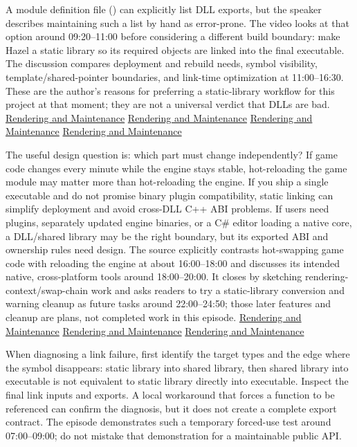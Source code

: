 A module definition file () can explicitly list DLL exports, but the speaker describes maintaining such a list by hand as error-prone. The video looks at that option around 09:20--11:00 before considering a different build boundary: make Hazel a static library so its required objects are linked into the final executable. The discussion compares deployment and rebuild needs, symbol visibility, template/shared-pointer boundaries, and link-time optimization at 11:00--16:30. These are the author's reasons for preferring a static-library workflow for this project at that moment; they are not a universal verdict that DLLs are bad. \href{https://www.youtube.com/watch?v=695SyEyFwWU&t=550s}{Rendering and Maintenance} \href{https://www.youtube.com/watch?v=695SyEyFwWU&t=660s}{Rendering and Maintenance} \href{https://www.youtube.com/watch?v=695SyEyFwWU&t=780s}{Rendering and Maintenance} \href{https://www.youtube.com/watch?v=695SyEyFwWU&t=930s}{Rendering and Maintenance}

The useful design question is: which part must change independently? If game code changes every minute while the engine stays stable, hot-reloading the game module may matter more than hot-reloading the engine. If you ship a single executable and do not promise binary plugin compatibility, static linking can simplify deployment and avoid cross-DLL C++ ABI problems. If users need plugins, separately updated engine binaries, or a C\# editor loading a native core, a DLL/shared library may be the right boundary, but its exported ABI and ownership rules need design. The source explicitly contrasts hot-swapping game code with reloading the engine at about 16:00--18:00 and discusses its intended native, cross-platform tools around 18:00--20:00. It closes by sketching rendering-context/swap-chain work and asks readers to try a static-library conversion and warning cleanup as future tasks around 22:00--24:50; those later features and cleanup are plans, not completed work in this episode. \href{https://www.youtube.com/watch?v=695SyEyFwWU&t=960s}{Rendering and Maintenance} \href{https://www.youtube.com/watch?v=695SyEyFwWU&t=1080s}{Rendering and Maintenance} \href{https://www.youtube.com/watch?v=695SyEyFwWU&t=1320s}{Rendering and Maintenance}

When diagnosing a link failure, first identify the target types and the edge where the symbol disappears: static library into shared library, then shared library into executable is not equivalent to static library directly into executable. Inspect the final link inputs and exports. A local workaround that forces a function to be referenced can confirm the diagnosis, but it does not create a complete export contract. The episode demonstrates such a temporary forced-use test around 07:00--09:00; do not mistake that demonstration for a maintainable public API.

